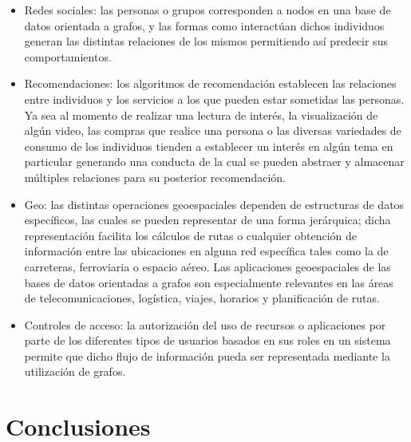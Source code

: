 \documentclass[preprint,12pt]{elsarticle}
\begin{document}
\begin{itemize}
\item Redes sociales: las personas o grupos corresponden a nodos en una base de datos orientada a grafos, y las formas como interactúan dichos individuos generan las distintas relaciones de los mismos permitiendo así predecir sus comportamientos.\\

\item Recomendaciones: los algoritmos de recomendación establecen las relaciones entre individuos y los servicios a los que pueden estar sometidas las personas. Ya sea al momento de realizar una lectura de interés, la visualización de algún video, las compras que realice una persona o las diversas variedades de consumo de los individuos tienden a establecer un interés en algún tema en particular generando una conducta de la cual se pueden abstraer y almacenar múltiples relaciones para su posterior recomendación. \\

\item Geo: las distintas operaciones geoespaciales dependen de estructuras de datos específicos, las cuales se pueden representar de una forma jerárquica; dicha representación facilita los cálculos de rutas o cualquier obtención de información entre las ubicaciones en alguna red específica tales como la de carreteras, ferroviaria o espacio aéreo. Las aplicaciones geoespaciales de las bases de datos orientadas a grafos son especialmente relevantes en las áreas de  telecomunicaciones, logística, viajes, horarios y planificación de rutas. \\

\item Controles de acceso: la autorización del uso de recursos o aplicaciones por parte de los diferentes tipos de usuarios basados en sus roles en un sistema permite que dicho flujo de información pueda ser representada mediante la utilización de grafos.  \\

\end{itemize}






\section{Conclusiones}
\end{document}
